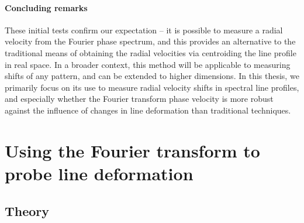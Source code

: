 %
%



\paragraph{Concluding remarks}
These initial  tests confirm our expectation --  it is possible to measure a radial velocity from
the Fourier phase spectrum, and this provides an alternative to the traditional 
means of obtaining the radial velocities via centroiding the line profile in real space. 
In a broader context, this method will be applicable to measuring shifts of any pattern, and  
can be extended to higher dimensions. In this thesis, we primarily focus on its use to measure radial velocity shifts in spectral line profiles, and especially whether the Fourier transform phase velocity is more
robust against the influence of changes in line deformation than traditional techniques.


\section{Using the Fourier transform to probe line deformation}
\label{\thesection}
\label{sec:FT_ld}


\subsection{Theory}
\label{sec:LD_Theory}

